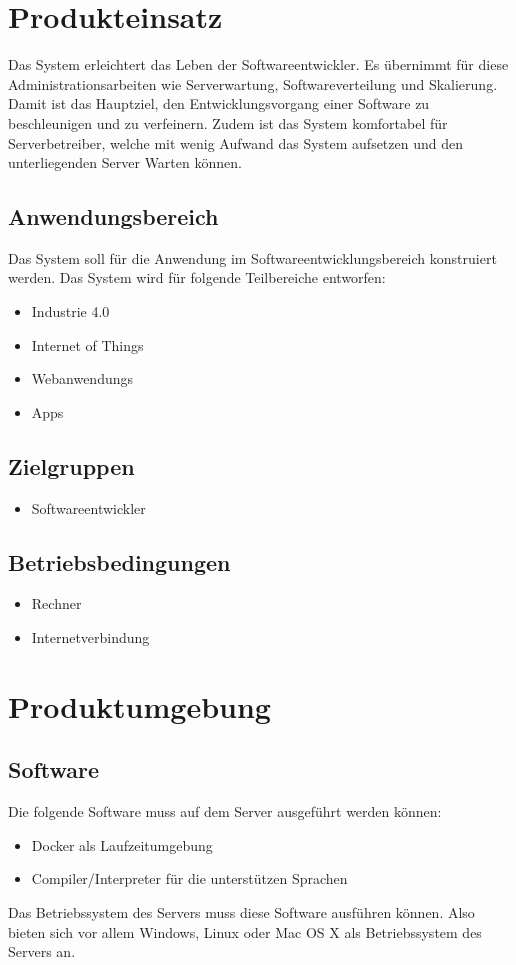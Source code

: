 \documentclass[a4paper,20pt,oneside]{book}
\begin{document}
\chapter{Produkteinsatz}
Das System erleichtert das Leben der Softwareentwickler. Es übernimmt für diese Administrationsarbeiten wie \Gls{Server}wartung, \Gls{Softwareverteilung} und \Gls{Skalierung}. Damit ist das Hauptziel, den Entwicklungsvorgang einer Software zu beschleunigen und zu verfeinern. 
Zudem ist das System komfortabel für \Gls{Serverbetreiber}, welche mit wenig Aufwand das System aufsetzen und den unterliegenden Server Warten können.
\section{Anwendungsbereich} 
Das System soll für die Anwendung im Softwareentwicklungsbereich konstruiert werden. Das System wird für folgende Teilbereiche entworfen:
\begin{itemize}
	\item \Gls{Industrie 4.0}
	\item \Gls{Internet of Things}
	\item \Glspl{Webanwendung}
	\item \Glspl{App}
\end{itemize}
\section{Zielgruppen}
\begin{itemize} 
	\item Softwareentwickler
\end{itemize}
\section{Betriebsbedingungen}
\begin{itemize}
	\item Rechner
	\item Internetverbindung 
\end{itemize}

\chapter{Produktumgebung}
\section{Software}
Die folgende Software muss auf dem \Gls{Server} ausgeführt werden können:
\begin{itemize}
\item \Gls{Docker} als Laufzeitumgebung
\item Compiler/Interpreter für die unterstützen Sprachen
\end{itemize}
Das Betriebssystem des Servers muss diese Software ausführen können. Also bieten sich vor allem Windows, Linux oder Mac OS X als Betriebssystem des Servers an.
\end{document}
